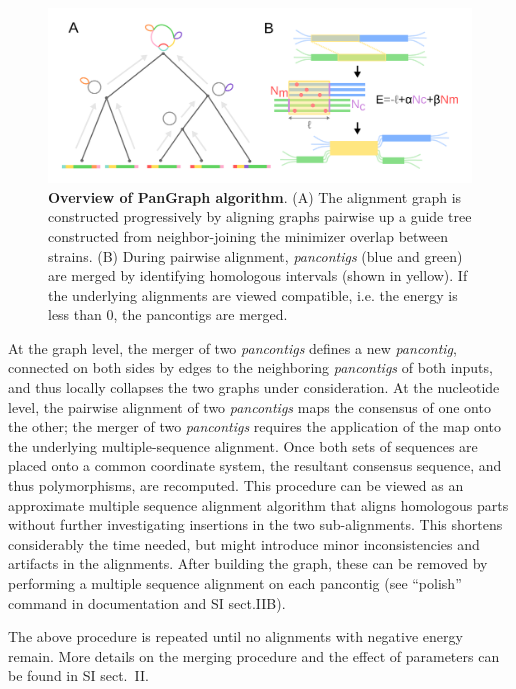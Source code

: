 \documentclass[aps,rmp,preprint,superscriptaddress,10pt,linenumbers]{revtex4-1}
\newcommand{\SIalgo}{II}
\begin{document}
\begin{figure}[htb]
    \includegraphics[width=.45\textwidth]{figs/algorithm.pdf}
    \caption{{\bf Overview of PanGraph algorithm}.
        (A) The alignment graph is constructed progressively by aligning graphs pairwise up a guide tree constructed from neighbor-joining the minimizer overlap between strains.
        (B) During pairwise alignment, \emph{pancontigs} (blue and green)
        are merged by identifying homologous intervals (shown in yellow).
        If the underlying alignments are viewed compatible, i.e. the energy is less than 0, the pancontigs are merged.
    }
    \label{fig:visualization}
\end{figure}

At the graph level, the merger of two \emph{pancontigs} defines a new \emph{pancontig}, connected on both sides by edges to the neighboring \emph{pancontigs} of both inputs, and thus locally collapses the two graphs under consideration.
At the nucleotide level, the pairwise alignment of two \emph{pancontigs} maps the consensus of one onto the other; the merger of two \emph{pancontigs} requires the application of the map onto the underlying multiple-sequence alignment.
Once both sets of sequences are placed onto a common coordinate system, the resultant consensus sequence, and thus polymorphisms, are recomputed.
This procedure can be viewed as an approximate multiple sequence alignment algorithm that aligns homologous parts without further investigating insertions in the two sub-alignments. This shortens considerably the time needed, but might introduce minor inconsistencies and artifacts in the alignments. After building the graph, these can be removed by performing a multiple sequence alignment on each pancontig  (see ``polish'' command in documentation and SI sect.{\SIalgo}B).

The above procedure is repeated until no alignments with negative energy remain.
More details on the merging procedure and the effect of parameters can be found in SI sect.~\SIalgo.
\end{document}
